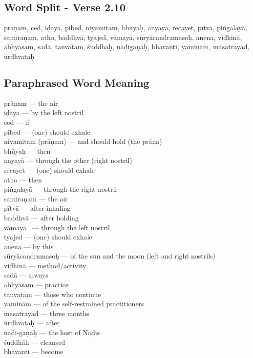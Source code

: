 \subsection*{Word Split - Verse 2.10}


prāṇam, ced, iḍayā, pibed, niyamitam, bhūyaḥ, anyayā, recayet,  pītvā, piṅgalayā, samīraṇam, atho, baddhvā, tyajed, vāmayā, sūryācandramasoḥ, anena, vidhinā, abhyāsam, sadā, tanvatām, śuddhāḥ, nāḍigaṇāḥ, bhavanti, yaminām, māsatrayād, ūrdhvataḥ

\subsection*{Paraphrased Word Meaning}


\begin{multicols}{2}
prāṇam --- the air \\
iḍayā --- by the left nostril \\
ced --- if \\
pibed --- (one) should exhale \\
niyamitam (prāṇam) --- and should hold (the prāṇa) \\
bhūyaḥ --- then \\
anyayā --- through the other (right nostril) \\
recayet --- (one) should exhale \\
atho --- then \\
piṅgalayā --- through the right nostril \\
samīraṇam --- the air \\
pītvā --- after inhaling \\
baddhvā --- after holding\\ 
vāmayā  --- through the left nostril \\
tyajed --- (one) should exhale \\
anena --- by this \\
sūryācandramasoḥ --- of the sun and the moon (left and right nostrils)\\
vidhinā --- method/activity \\
sadā  --- always \\
abhyāsam --- practice \\
tanvatām --- those who continue \\
yaminām --- of the self-restrained practitioners\\
māsatrayād --- three months \\
ūrdhvataḥ --- after \\
nāḍi-gaṇāḥ --- the host of Nāḍīs \\
śuddhāḥ --- cleansed \\
bhavanti  --- become
\end{multicols}

